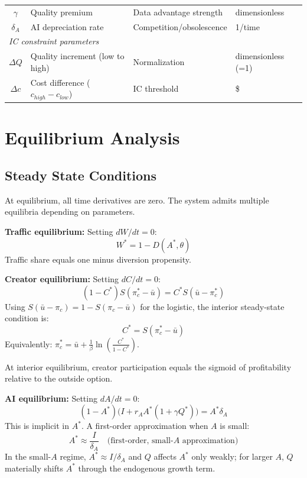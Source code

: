 \documentclass[11pt,a4paper]{article}
\begin{document}
\begin{center}
\begin{tabular}{clll}
$\gamma$ & Quality premium & Data advantage strength & dimensionless \\
$\delta_A$ & AI depreciation rate & Competition/obsolescence & 1/time \\
\midrule
\multicolumn{4}{l}{\textit{IC constraint parameters}} \\
$\Delta Q$ & Quality increment (low to high) & Normalization & dimensionless (=1) \\
$\Delta c$ & Cost difference ($c_{high} - c_{low}$) & IC threshold & \$ \\
\bottomrule
\end{tabular}
\end{center}

\section{Equilibrium Analysis}

\subsection{Steady State Conditions}

At equilibrium, all time derivatives are zero. The system admits multiple equilibria depending on parameters.

\textbf{Traffic equilibrium:} Setting $dW/dt = 0$:
\begin{equation}
W^* = 1 - D(A^*, \theta)
\end{equation}
Traffic share equals one minus diversion propensity.

\textbf{Creator equilibrium:} Setting $dC/dt = 0$:
\begin{equation}
(1-C^*)S(\pi_c^* - \bar{u}) = C^* S(\bar{u} - \pi_c^*)
\end{equation}
Using $S(\bar{u} - \pi_c) = 1 - S(\pi_c - \bar{u})$ for the logistic, the interior steady-state condition is:
\begin{equation}
C^* = S(\pi_c^* - \bar{u})
\end{equation}
Equivalently: $\pi_c^* = \bar{u} + \frac{1}{\beta}\ln\left(\frac{C^*}{1-C^*}\right)$.

At interior equilibrium, creator participation equals the sigmoid of profitability relative to the outside option.

\textbf{AI equilibrium:} Setting $dA/dt = 0$:
\begin{equation}
(1-A^*)\big(I + r_A A^* (1 + \gamma Q^*)\big) = A^* \delta_A
\end{equation}
This is implicit in $A^*$. A first-order approximation when $A$ is small:
\begin{equation}
A^* \approx \frac{I}{\delta_A} \quad \text{(first-order, small-}A\text{ approximation)}
\end{equation}
In the small-$A$ regime, $A^* \approx I/\delta_A$ and $Q$ affects $A^*$ only weakly; for larger $A$, $Q$ materially shifts $A^*$ through the endogenous growth term.
\end{document}

